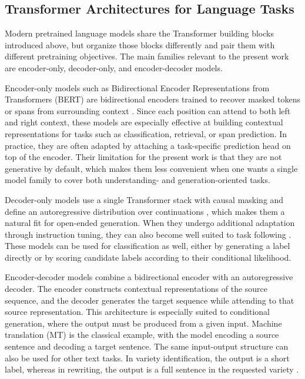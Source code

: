 \subsection{Transformer Architectures for Language Tasks}
\label{sec:model-families}

Modern pretrained language models share the Transformer building blocks
introduced above, but organize those blocks differently and pair them with
different pretraining objectives. The main families relevant to the present
work are encoder-only, decoder-only, and encoder-decoder models.

Encoder-only models such as Bidirectional Encoder Representations from Transformers (BERT) are bidirectional encoders trained to recover
masked tokens or spans from surrounding context
\citep{devlin-etal-2019-bert}. Since each position can
attend to both left and right context, these models are especially effective at
building contextual representations for tasks such as classification, retrieval,
or span prediction. In practice, they are often adapted by attaching a
task-specific prediction head on top of the encoder. Their limitation for the
present work is that they are not generative by default, which makes them less convenient
when one wants a single model family to cover both understanding- and
generation-oriented tasks.

Decoder-only models use a single Transformer stack with causal masking and
define an autoregressive distribution over continuations
\citep{10.5555/3495724.3495883}, which makes them a natural fit for open-ended
generation. When they undergo additional adaptation through instruction tuning,
they can also become well suited to task following
\citep{chung2022scalinginstructionfinetunedlanguagemodels}. These models can be used for
classification as well, either by generating a label directly or by scoring
candidate labels according to their conditional likelihood.

Encoder-decoder models combine a bidirectional encoder with an autoregressive
decoder. The encoder constructs contextual representations of the source
sequence, and the decoder generates the target sequence while attending to that
source representation. This architecture is especially suited to conditional
generation, where the output must be produced from a given input. Machine
translation (MT) is the classical example, with the model encoding a source
sentence and decoding a target sentence. The same input-output structure can also
be used for other text tasks. In variety identification, the output is a short
label, whereas in rewriting, the output is a full sentence in the requested variety
\mbox{\citep{Raffel2019ExploringTL}}.

